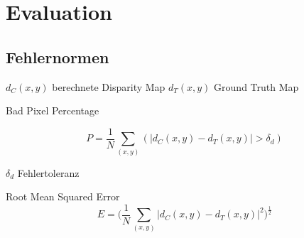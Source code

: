 \section{Evaluation}

\subsection{Fehlernormen}

\(d_C(x, y) \) berechnete Disparity Map
\(d_T(x, y) \) Ground Truth Map

Bad Pixel Percentage

\begin{equation}
 P = \frac{1}{N} \sum_{(x, y)}(|d_C(x, y)-d_T(x, y)|>\delta_d)
\end{equation}

\(\delta_d \) Fehlertoleranz

Root Mean Squared Error
\begin{equation}
 E = \bigg( \frac{1}{N}\sum_{(x, y)}|d_C(x, y)-d_T(x, y)|^2 \bigg)^{\frac{1}{2}}
\end{equation}
